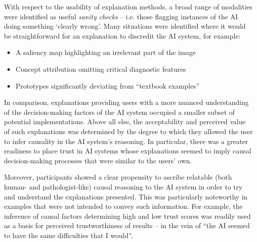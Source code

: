 With respect to the usability of explanation methods, a broad range of modalities were identified as useful \textit{sanity checks} -- i.e. those flagging instances of the AI doing something `clearly wrong'. Many situations were identified where it would be straightforward for an explanation to discredit the AI system, for example: 

\begin{itemize}
    \item A saliency map highlighting an irrelevant part of the image
    \item Concept attribution omitting critical diagnostic features
    \item Prototypes significantly deviating from ``textbook examples''
\end{itemize}


In comparison, explanations providing users with a more nuanced understanding of the decision-making factors of the AI system occupied a smaller subset of potential implementations. Above all else, the acceptability and perceived value of such explanations was determined by the degree to which they allowed the user to infer causality in the AI system's reasoning. In particular, there was a greater readiness to place trust in AI systems whose explanations seemed to imply causal decision-making processes that were similar to the users' own.


Moreover, participants showed a clear propensity to ascribe relatable (both human- and pathologist-like) causal reasoning to the AI system in order to try and understand the explanations presented. This was particularly noteworthy in examples that were not intended to convey such information. For example, the inference of causal factors determining high and low trust scores was readily used as a basis for perceived trustworthiness of results -- in the vein of ``the AI seemed to have the same difficulties that I would''.

